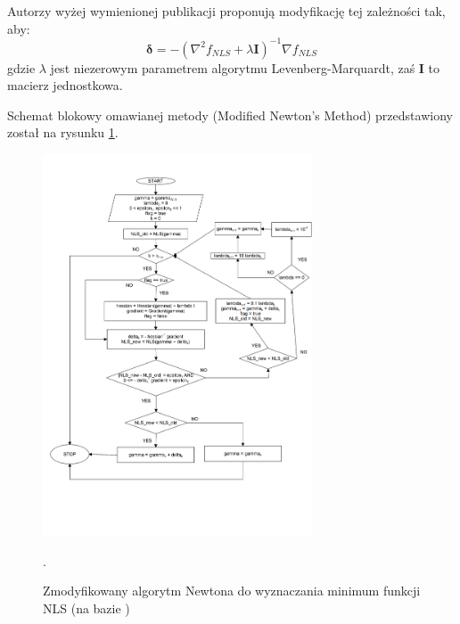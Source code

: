 Autorzy wyżej wymienionej publikacji proponują modyfikację tej zależności tak, aby:
\begin{equation}
\boldsymbol{\delta}=-\left(\nabla^2{f_{NLS}}+\lambda \boldsymbol{I}\right)^{-1}\nabla{f_{NLS}}
\label{Eq:m6_eq_22}
\end{equation}
gdzie $\lambda$ jest niezerowym parametrem algorytmu Levenberg-Marquardt, zaś $\boldsymbol{I}$ to macierz jednostkowa.

Schemat blokowy omawianej metody (Modified Newton's Method) przedstawiony został na rysunku \ref{fig:m6_pic_1}.

\begin{figure}[!h]
	\includegraphics[width=8cm]{figures/Module_06/mfn}
	\centering
	\caption{Zmodyfikowany algorytm Newtona do wyznaczania minimum funkcji NLS (na bazie \cite{m6_koay2006a})}.
	\label{fig:m6_pic_1}
\end{figure}